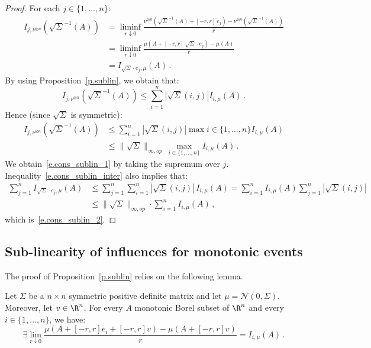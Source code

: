 \begin{proof}
For each $j\in\lbrace 1,\dots, n\rbrace$:
\begin{align*}
I_{j,\nu^{\otimes n}}(\sqrt{\Sigma}^{-1} \left(A \right)) & = \underset{r \downarrow 0}{\liminf} \frac{\nu^{\otimes n} \left(\sqrt{\Sigma}^{-1} \left(A \right) + [-r,r] \, e_j \right) - \nu^{\otimes n} \left(\sqrt{\Sigma}^{-1} \left(A \right) \right)}{r}\\
& = \underset{r \downarrow 0}{\liminf} \frac{\mu \left(A + [-r,r] \, \sqrt{\Sigma} \cdot e_j \right) - \mu \left(A \right)}{r}\\
& = I_{\sqrt{\Sigma} \cdot e_j,\mu}(A) \,.
\end{align*}
By using Proposition~\ref{p.sublin}, we obtain that:
\begin{equation}\label{e.cons_sublin_inter}
I_{j,\nu^{\otimes n}}(\sqrt{\Sigma}^{-1} \left(A \right)) \leq \sum_{i = 1}^n |\sqrt{\Sigma}(i,j)| I_{i,\mu}(A) \,.
\end{equation}
Hence (since $\sqrt{\Sigma}$ is symmetric):
\begin{align*}
I_{j,\nu^{\otimes n}}(\sqrt{\Sigma}^{-1} \left(A \right))& \leq \sum_{i = 1}^n |\sqrt{\Sigma}(i,j)| \max{i \in \lbrace 1,\dots, n \rbrace} I_{i,\mu}(A) \\
&\leq \|\sqrt{\Sigma} \|_{\infty,op} \, \max_{i \in \lbrace 1,\dots, n \rbrace} I_{i,\mu}(A) \,.
\end{align*}
We obtain~\eqref{e.cons_sublin_1} by taking the supremum over $j$. Inequality~\eqref{e.cons_sublin_inter} also implies that:
\begin{align*}
\sum_{j=1}^n I_{\sqrt{\Sigma} \cdot e_j,\mu}(A) & \leq \sum_{j=1}^n \sum_{i=1}^n |\sqrt{\Sigma}(i,j)| \, I_{i,\mu}(A)
 = \sum_{i=1}^n I_{i,\mu}(A) \sum_{j=1}^n |\sqrt{\Sigma}(i,j)|\\
& \leq \|\sqrt{\Sigma}\|_{\infty,op} \cdot \sum_{i=1}^n I_{i,\mu}(A) \,,
\end{align*}
which is~\eqref{e.cons_sublin_2}.
\end{proof}

\subsection{Sub-linearity of influences for monotonic events}\label{ss.monotonic}

The proof of Proposition~\ref{p.sublin} relies on the following lemma.

\begin{lemm}\label{l.conv}
Let $\Sigma$ be a $n \times n$ symmetric positive definite matrix and let $\mu = \mathcal{N}(0,\Sigma)$. Moreover, let $v \in \R^n$. For every $A$ monotonic Borel subset of $\R^n$ and every $i \in \lbrace 1,\dots, n \rbrace$, we have:
\[
\exists \lim_{r \downarrow 0} \frac{\mu \left(A + [-r,r] e_i + [-r,r]v \right) - \mu \left(A + [-r,r]v \right)}{r} = I_{i,\mu}(A) \,.
\]
\end{lemm}


